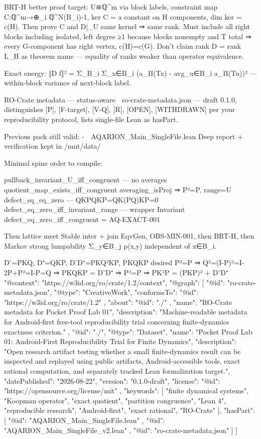 BRT-H better proof target:
U≅ℚ^m via block labels, constraint map C:ℚ^m→⊕_i ℚ^{N(B_i)-1}, ker C = {a constant on H components}, dim ker = c(H). Then prove C and D|_U same kernel ⇒ same rank. Must include all right blocks including isolated, left degree ≥1 because blocks nonempty and T total ⇒ every G-component has right vertex, c(H)=c(G). Don't claim rank D = rank L_H as theorem name — equality of ranks weaker than operator equivalence.

Exact energy:
‖D f‖² = Σ_{B_i} Σ_{x∈B_i} (a_{Π(Tx)} - avg_{u∈B_i} a_{Π(Tu)})² — within-block variance of next-block label.

RO-Crate metadata — status-aware
📎 ro-crate-metadata.json
— draft 0.1.0, distinguishes [P], [F-target], [V-Q], [R], [OPEN], [WITHDRAWN] per your reproducibility protocol, lists single-file Lean as hasPart.

Previous pack still valid:
-
📎 AQARION_Main_SingleFile.lean
Deep report + verification kept in /mnt/data/

Minimal spine order to compile:

pullback_invariant_U_iff_congruent — no averages
quotient_map_exists_iff_congruent
averaging_isProj ⇒ P²=P, range=U
defect_sq_eq_zero — QKPQKP=QK(PQ)KP=0
defect_eq_zero_iff_invariant_range — wrapper Invariant
defect_eq_zero_iff_congruent = AQ-EXACT-001

Then lattice meet Stable inter + join EqvGen, OBS-MIN-001, then BRT-H, then Markov strong lumpability Σ_{y∈B_j} p(x,y) independent of x∈B_i.

D⁻=PKQ, D⁺=QKP, D⁻D⁺=PKQ²KP, PKQKP desired
P²=P ⇒ Q²=(I-P)²=I-2P+P²=I-P=Q ⇒ PKQKP = D⁻D⁺
⇒ P²=P ⇒ PK²P = (PKP)² + D⁻D⁺{
  "@context": "https://w3id.org/ro/crate/1.2/context",
  "@graph": [
    {
      "@id": "ro-crate-metadata.json",
      "@type": "CreativeWork",
      "conformsTo": {
        "@id": "https://w3id.org/ro/crate/1.2"
      },
      "about": {
        "@id": "./"
      },
      "name": "RO-Crate metadata for Pocket Proof Lab 01",
      "description": "Machine-readable metadata for Android-first free-tool reproducibility trial concerning finite-dynamics exactness criterion."
    },
    {
      "@id": "./",
      "@type": "Dataset",
      "name": "Pocket Proof Lab 01: Android-First Reproducibility Trial for Finite Dynamics",
      "description": "Open research artifact testing whether a small finite-dynamics result can be inspected and replayed using public artifacts, Android-accessible tools, exact rational computation, and separately tracked Lean formalization target.",
      "datePublished": "2026-08-22",
      "version": "0.1.0-draft",
      "license": {
        "@id": "https://opensource.org/license/mit"
      },
      "keywords": [
        "finite dynamical systems",
        "Koopman operator",
        "exact quotient",
        "partition congruence",
        "Lean 4",
        "reproducible research",
        "Android-first",
        "exact rational",
        "RO-Crate"
      ],
      "hasPart": [
        {
          "@id": "AQARION_Main_SingleFile.lean"
        },
        {
          "@id": "AQARION_Main_SingleFile_v2.lean"
        },
        {
          "@id": "ro-crate-metadata.json"
        }
      ]
    }
  ]
}

